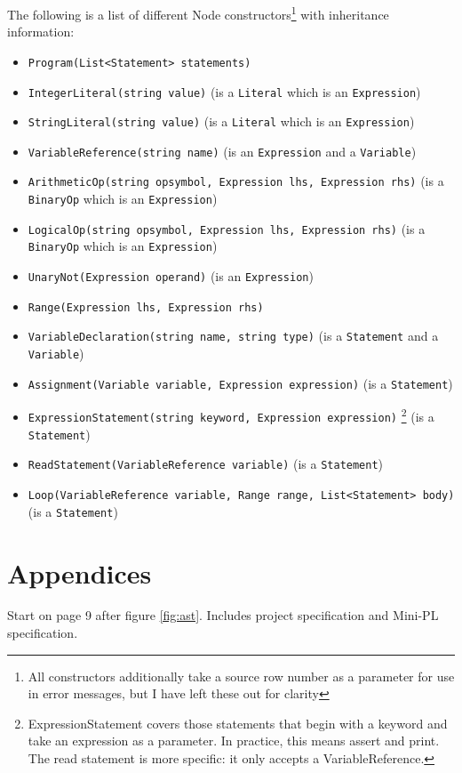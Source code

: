 \documentclass[a4paper,11pt]{article}
\begin{document}
The following is a list of different Node constructors\footnote{All constructors additionally take a source row number as a parameter for use in error messages, but I have left these out for clarity} with inheritance information:
\begin{itemize}
    \item \verb,Program(List<Statement> statements),
    \item \verb,IntegerLiteral(string value), (is a \verb,Literal, which is an \verb,Expression,)
    \item \verb,StringLiteral(string value), (is a \verb,Literal, which is an \verb,Expression,)
    \item \verb,VariableReference(string name), (is an \verb,Expression, and a \verb,Variable,)
    \item \verb/ArithmeticOp(string opsymbol, Expression lhs, Expression rhs)/ (is a \verb,BinaryOp, which is an \verb,Expression,)
    \item \verb/LogicalOp(string opsymbol, Expression lhs, Expression rhs)/ (is a \verb,BinaryOp, which is an \verb,Expression,)
    \item \verb/UnaryNot(Expression operand)/ (is an \verb,Expression,)
    \item \verb/Range(Expression lhs, Expression rhs)/
    \item \verb/VariableDeclaration(string name, string type)/ (is a \verb,Statement, and a \verb,Variable,)
    \item \verb/Assignment(Variable variable, Expression expression)/ (is a \verb,Statement,)
    \item \verb/ExpressionStatement(string keyword, Expression expression)/ \footnote{ExpressionStatement covers those statements that begin with a keyword and take an expression as a parameter. In practice, this means assert and print. The read statement is more specific: it only accepts a VariableReference.} (is a \verb,Statement,)
    \item \verb/ReadStatement(VariableReference variable)/ (is a \verb,Statement,)
    \item \verb/Loop(VariableReference variable, Range range, List<Statement> body)/ (is a \verb,Statement,)
\end{itemize}

\appendix
\section{Appendices}

Start on page 9 after figure \ref{fig:ast}. Includes project specification and Mini-PL specification.




\end{document}
